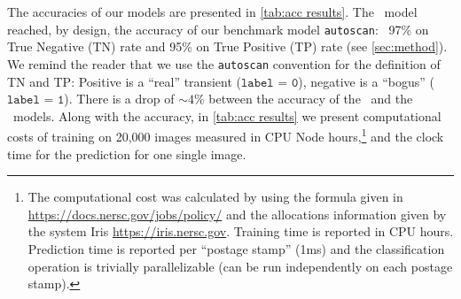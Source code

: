 

The accuracies of our models %
are presented in \autoref{tab:acc results}. The \diabased\ model reached, by design, the accuracy of our benchmark model \texttt{autoscan}: ~97\% on True Negative (TN) rate and 95\% on True Positive (TP) rate (see \autoref{sec:method}). We remind the reader that we use the \texttt{autoscan} convention for the definition of TN and TP: Positive is a ``real'' transient ($\texttt{label = 0}$), negative is a ``bogus'' ($\texttt{label = 1}$). There is a drop of $\sim 4\%$ between the accuracy of the \diabased\ and the \nodia\ models. Along with the accuracy, in \autoref{tab:acc results} we present computational costs of training on 20,000 images measured in CPU Node hours,\footnote{The computational cost was calculated by using the formula given in \url{https://docs.nersc.gov/jobs/policy/} and the allocations information given by the system Iris \url{https://iris.nersc.gov}. Training time is reported in CPU hours. Prediction time is reported per “postage stamp” (1ms) and the classification operation is trivially parallelizable (can be run independently on each postage stamp).} and the clock time for the prediction for one single image.

